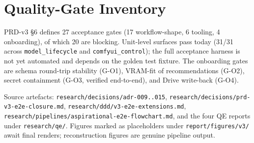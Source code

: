 \documentclass[a4paper,11pt]{report}
\newcommand{\code}[1]{\texttt{#1}}
\begin{document}
\chapter{Quality-Gate Inventory}
PRD-v3 \S6 defines 27 acceptance gates (17 workflow-shape, 6 tooling, 4 onboarding), of which 20 are
blocking. Unit-level surfaces pass today (31/31 across \code{model\_lifecycle} and
\code{comfyui\_control}); the full acceptance harness is not yet automated and depends on the golden
test fixture. The onboarding gates are schema round-trip stability (G-O1), VRAM-fit of recommendations
(G-O2), secret containment (G-O3, verified end-to-end), and Drive write-back (G-O4).

\vfill
\noindent\textcolor{MidGrey}{\footnotesize\raggedright Source artefacts: \code{research/decisions/adr-009..015},
\code{research/decisions/prd-v3-e2e-closure.md}, \code{research/ddd/v3-e2e-extensions.md},
\code{research/pipelines/aspirational-e2e-flowchart.md}, and the four QE reports under
\code{research/qe/}. Figures marked as placeholders under \code{report/figures/v3/} await final
renders; reconstruction figures are genuine pipeline output.}
\end{document}
